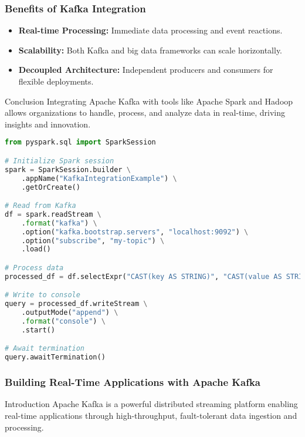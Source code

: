 \documentclass[aspectratio=169]{beamer}
\begin{document}
\begin{frame}[fragile]
    \frametitle{Benefits of Kafka Integration}
    \begin{itemize}
        \item \textbf{Real-time Processing:} Immediate data processing and event reactions.
        \item \textbf{Scalability:} Both Kafka and big data frameworks can scale horizontally.
        \item \textbf{Decoupled Architecture:} Independent producers and consumers for flexible deployments.
    \end{itemize}
    \begin{block}{Conclusion}
        Integrating Apache Kafka with tools like Apache Spark and Hadoop allows organizations to handle, process, and analyze data in real-time, driving insights and innovation.
    \end{block}
    
    \begin{lstlisting}[language=python]
from pyspark.sql import SparkSession

# Initialize Spark session
spark = SparkSession.builder \
    .appName("KafkaIntegrationExample") \
    .getOrCreate()

# Read from Kafka
df = spark.readStream \
    .format("kafka") \
    .option("kafka.bootstrap.servers", "localhost:9092") \
    .option("subscribe", "my-topic") \
    .load()

# Process data
processed_df = df.selectExpr("CAST(key AS STRING)", "CAST(value AS STRING)")

# Write to console
query = processed_df.writeStream \
    .outputMode("append") \
    .format("console") \
    .start()

# Await termination
query.awaitTermination()
\end{lstlisting}
\end{frame}

\begin{frame}
    \frametitle{Building Real-Time Applications with Apache Kafka}
    \begin{block}{Introduction}
        Apache Kafka is a powerful distributed streaming platform enabling real-time applications through high-throughput, fault-tolerant data ingestion and processing.
    \end{block}
\end{frame}
\end{document}
